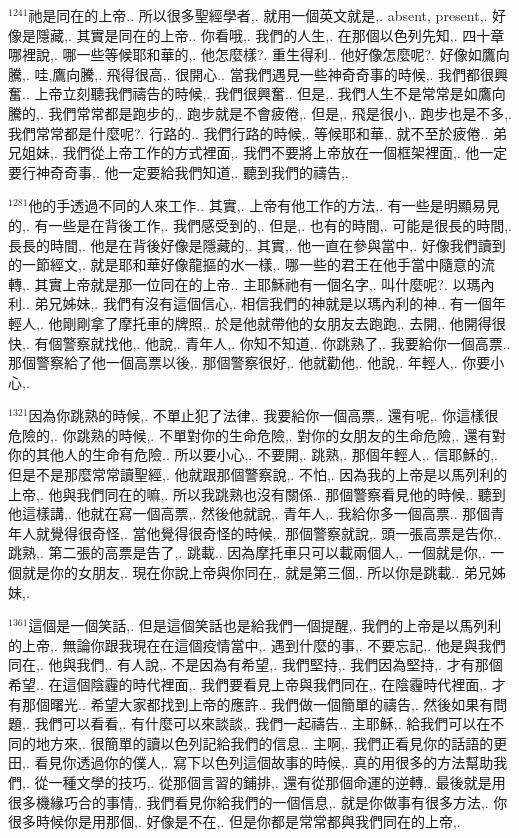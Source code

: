 \documentclass{book}
\begin{document}
$^{1241}$祂是同在的上帝..
所以很多聖經學者,.
就用一個英文就是,.
absent, present,.
好像是隱藏,.
其實是同在的上帝..
你看哦,.
我們的人生,.
在那個以色列先知,.
四十章哪裡說,.
哪一些等候耶和華的,.
他怎麼樣?.
重生得利..
他好像怎麼呢?.
好像如鷹向騰,.
哇,鷹向騰,.
飛得很高,.
很開心..
當我們遇見一些神奇奇事的時候,.
我們都很興奮..
上帝立刻聽我們禱告的時候,.
我們很興奮..
但是,.
我們人生不是常常是如鷹向騰的,.
我們常常都是跑步的,.
跑步就是不會疲倦,.
但是,.
飛是很小,.
跑步也是不多,.
我們常常都是什麼呢?.
行路的..
我們行路的時候,.
等候耶和華,.
就不至於疲倦..
弟兄姐妹,.
我們從上帝工作的方式裡面,.
我們不要將上帝放在一個框架裡面,.
他一定要行神奇奇事,.
他一定要給我們知道,.
聽到我們的禱告,.

$^{1281}$他的手透過不同的人來工作..
其實,.
上帝有他工作的方法,.
有一些是明顯易見的,.
有一些是在背後工作,.
我們感受到的,.
但是,.
也有的時間,.
可能是很長的時間,.
長長的時間,.
他是在背後好像是隱藏的,.
其實,.
他一直在參與當中,.
好像我們讀到的一節經文,.
就是耶和華好像龍摳的水一樣,.
哪一些的君王在他手當中隨意的流轉,.
其實上帝就是那一位同在的上帝..
主耶穌祂有一個名字,.
叫什麼呢?.
以瑪內利..
弟兄姊妹,.
我們有沒有這個信心,.
相信我們的神就是以瑪內利的神..
有一個年輕人,.
他剛剛拿了摩托車的牌照,.
於是他就帶他的女朋友去跑跑,.
去開,.
他開得很快,.
有個警察就找他,.
他說,.
青年人,.
你知不知道,.
你跳熟了,.
我要給你一個高票..
那個警察給了他一個高票以後,.
那個警察很好,.
他就勸他,.
他說,.
年輕人,.
你要小心,.

$^{1321}$因為你跳熟的時候,.
不單止犯了法律,.
我要給你一個高票,.
還有呢,.
你這樣很危險的,.
你跳熟的時候,.
不單對你的生命危險,.
對你的女朋友的生命危險,.
還有對你的其他人的生命有危險..
所以要小心,.
不要開,.
跳熟,.
那個年輕人,.
信耶穌的,.
但是不是那麼常常讀聖經,.
他就跟那個警察說,.
不怕,.
因為我的上帝是以馬列利的上帝,.
他與我們同在的嘛,.
所以我跳熟也沒有關係..
那個警察看見他的時候,.
聽到他這樣講,.
他就在寫一個高票,.
然後他就說,.
青年人,.
我給你多一個高票..
那個青年人就覺得很奇怪,.
當他覺得很奇怪的時候,.
那個警察就說,.
頭一張高票是告你,.
跳熟,.
第二張的高票是告了,.
跳載..
因為摩托車只可以載兩個人,.
一個就是你,.
一個就是你的女朋友,.
現在你說上帝與你同在,.
就是第三個,.
所以你是跳載..
弟兄姊妹,.

$^{1361}$這個是一個笑話,.
但是這個笑話也是給我們一個提醒,.
我們的上帝是以馬列利的上帝,.
無論你跟我現在在這個疫情當中,.
遇到什麼的事,.
不要忘記,.
他是與我們同在,.
他與我們,.
有人說,.
不是因為有希望,.
我們堅持,.
我們因為堅持,.
才有那個希望..
在這個陰霾的時代裡面,.
我們要看見上帝與我們同在,.
在陰霾時代裡面,.
才有那個曙光..
希望大家都找到上帝的應許..
我們做一個簡單的禱告,.
然後如果有問題,.
我們可以看看,.
有什麼可以來談談,.
我們一起禱告..
主耶穌,.
給我們可以在不同的地方來,.
很簡單的讀以色列記給我們的信息..
主啊,.
我們正看見你的話語的更田,.
看見你透過你的僕人,.
寫下以色列這個故事的時候,.
真的用很多的方法幫助我們,.
從一種文學的技巧,.
從那個言習的鋪排,.
還有從那個命運的逆轉,.
最後就是用很多機緣巧合的事情,.
我們看見你給我們的一個信息,.
就是你做事有很多方法,.
你很多時候你是用那個,.
好像是不在,.
但是你都是常常都與我們同在的上帝,.
\end{document}

